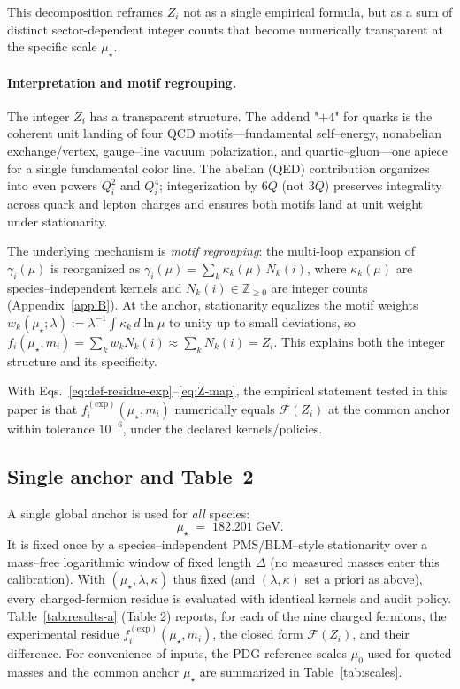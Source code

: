 \documentclass[aps,prd,onecolumn,amsmath,amssymb,superscriptaddress,nofootinbib,showpacs,showkeys]{revtex4-2}
\begin{document}
This decomposition reframes $Z_i$ not as a single empirical formula, but as a sum of distinct sector-dependent integer counts that become numerically transparent at the specific scale $\mu_\star$.

\paragraph{Interpretation and motif regrouping.}
The integer $Z_i$ has a transparent structure. The addend "$+4$" for quarks is the coherent unit landing of four QCD motifs—fundamental self–energy, nonabelian exchange/vertex, gauge–line vacuum polarization, and quartic–gluon—one apiece for a single fundamental color line. The abelian (QED) contribution organizes into even powers $Q_i^2$ and $Q_i^4$; integerization by $6Q$ (not $3Q$) preserves integrality across quark and lepton charges and ensures both motifs land at unit weight under stationarity.

The underlying mechanism is \emph{motif regrouping}: the multi-loop expansion of $\gamma_i(\mu)$ is reorganized as $\gamma_i(\mu)=\sum_k \kappa_k(\mu)\,N_k(i)$, where $\kappa_k(\mu)$ are species–independent kernels and $N_k(i)\in\mathbb{Z}_{\ge0}$ are integer counts (Appendix~\ref{app:B}). At the anchor, stationarity equalizes the motif weights $w_k(\mu_\star;\lambda):=\lambda^{-1}\int \kappa_k\,d\ln\mu$ to unity up to small deviations, so $f_i(\mu_\star,m_i)=\sum_k w_k N_k(i)\approx\sum_k N_k(i)=Z_i$. This explains both the integer structure and its specificity.

With Eqs.~\ref{eq:def-residue-exp}–\ref{eq:Z-map}, the empirical statement tested in this paper is that $f_i^{\mathrm{(exp)}}(\mu_\star,m_i)$ numerically equals $\mathcal F(Z_i)$ at the common anchor within tolerance $10^{-6}$, under the declared kernels/policies.

\subsection{Single anchor and Table~2}
A single global anchor is used for \emph{all} species:
\[
\mu_\star \;=\; 182.201~\mathrm{GeV}.
\]
It is fixed once by a species–independent PMS/BLM–style stationarity over a mass–free logarithmic window of fixed length $\Delta$ (no measured masses enter this calibration). With $(\mu_\star,\lambda,\kappa)$ thus fixed (and $(\lambda,\kappa)$ set a priori as above), every charged-fermion residue is evaluated with identical kernels and audit policy. Table~\ref{tab:results-a} (Table 2) reports, for each of the nine charged fermions, the experimental residue $f_i^{\mathrm{(exp)}}(\mu_\star,m_i)$, the closed form $\mathcal F(Z_i)$, and their difference. For convenience of inputs, the PDG reference scales $\mu_0$ used for quoted masses and the common anchor $\mu_\star$ are summarized in Table~\ref{tab:scales}.
\end{document}
